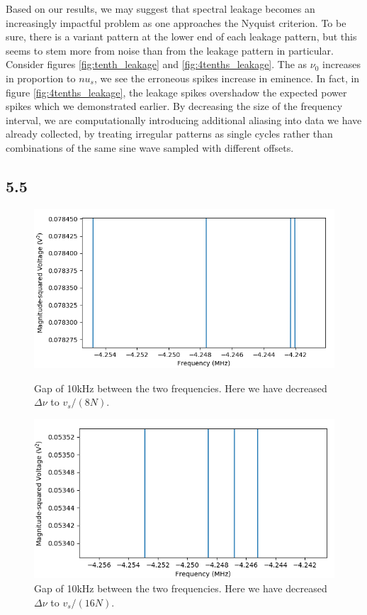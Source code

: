 \documentclass[a4paper]{article}
\begin{document}
Based on our results, we may suggest that spectral leakage becomes an increasingly impactful problem as one approaches the Nyquist criterion. To be sure, there is a variant pattern at the lower end of each leakage pattern, but this seems to stem more from noise than from the leakage pattern in particular. Consider figures \ref{fig:tenth_leakage} and \ref{fig:4tenths_leakage}. The as $\nu_0$ increases in proportion to $nu_s$, we see the erroneous spikes increase in eminence. In fact, in figure \ref{fig:4tenths_leakage}, the leakage spikes overshadow the expected power spikes which we demonstrated earlier. By decreasing the size of the frequency interval, we are computationally introducing additional aliasing into data we have already collected, by treating irregular patterns as single cycles rather than combinations of the same sine wave sampled with different offsets.



\subsection{5.5}

\begin{figure}
\centering
\begin{minipage}{.5\textwidth}
	\centering
	\includegraphics[width=.9\linewidth]{5-5/10k_factor8}
	\caption{Gap of 10kHz between the \hfill \break two frequencies. Here we have decreased \hfill \break $\Delta \nu$ to $v_s / (8N)$.}
	\label{fig:10kf8}
\end{minipage}%
\begin{minipage}{.5\textwidth}
	\centering
	\includegraphics[width=.9\linewidth]{5-5/5k_factor16}
	\caption{Gap of 10kHz between the two frequencies. Here we have decreased $\Delta \nu$ to $v_s / (16N)$.}
	\label{fig:5kf16}
\end{minipage}
\end{figure}
\end{document}
